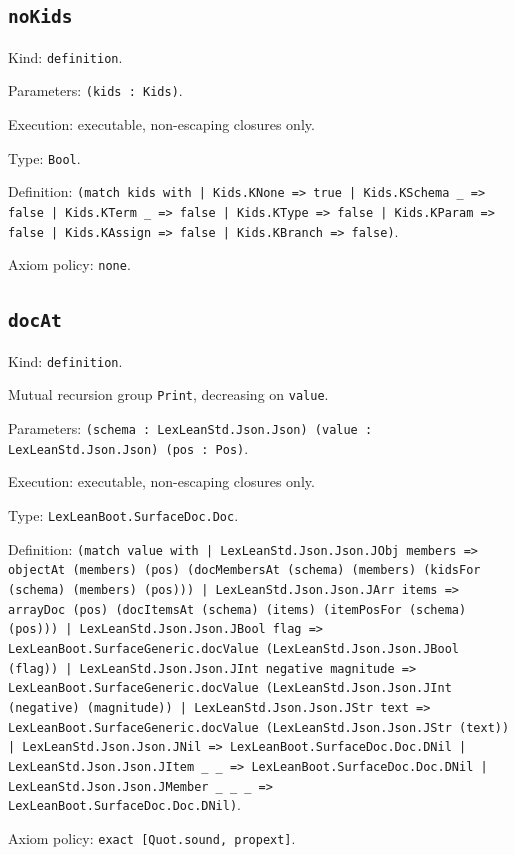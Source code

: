 \documentclass[11pt]{article}
\begin{document}
\subsection*{\texttt{noKids}}
\noindent Kind: \texttt{definition}.\par
\noindent Parameters: \texttt{(kids : Kids)}.\par
\noindent Execution: executable, non-escaping closures only.\par
\noindent Type: \texttt{Bool}.\par
\noindent Definition: \texttt{(match kids with | Kids.KNone => true | Kids.KSchema \_ => false | Kids.KTerm \_ => false | Kids.KType => false | Kids.KParam => false | Kids.KAssign => false | Kids.KBranch => false)}.\par
\noindent Axiom policy: \texttt{none}.\par
\subsection*{\texttt{docAt}}
\noindent Kind: \texttt{definition}.\par
\noindent Mutual recursion group \texttt{Print}, decreasing on \texttt{value}.\par
\noindent Parameters: \texttt{(schema : LexLeanStd.Json.Json) (value : LexLeanStd.Json.Json) (pos : Pos)}.\par
\noindent Execution: executable, non-escaping closures only.\par
\noindent Type: \texttt{LexLeanBoot.SurfaceDoc.Doc}.\par
\noindent Definition: \texttt{(match value with | LexLeanStd.Json.Json.JObj members => objectAt (members) (pos) (docMembersAt (schema) (members) (kidsFor (schema) (members) (pos))) | LexLeanStd.Json.Json.JArr items => arrayDoc (pos) (docItemsAt (schema) (items) (itemPosFor (schema) (pos))) | LexLeanStd.Json.Json.JBool flag => LexLeanBoot.SurfaceGeneric.docValue (LexLeanStd.Json.Json.JBool (flag)) | LexLeanStd.Json.Json.JInt negative magnitude => LexLeanBoot.SurfaceGeneric.docValue (LexLeanStd.Json.Json.JInt (negative) (magnitude)) | LexLeanStd.Json.Json.JStr text => LexLeanBoot.SurfaceGeneric.docValue (LexLeanStd.Json.Json.JStr (text)) | LexLeanStd.Json.Json.JNil => LexLeanBoot.SurfaceDoc.Doc.DNil | LexLeanStd.Json.Json.JItem \_ \_ => LexLeanBoot.SurfaceDoc.Doc.DNil | LexLeanStd.Json.Json.JMember \_ \_ \_ => LexLeanBoot.SurfaceDoc.Doc.DNil)}.\par
\noindent Axiom policy: \texttt{exact [Quot.sound, propext]}.\par
\end{document}
